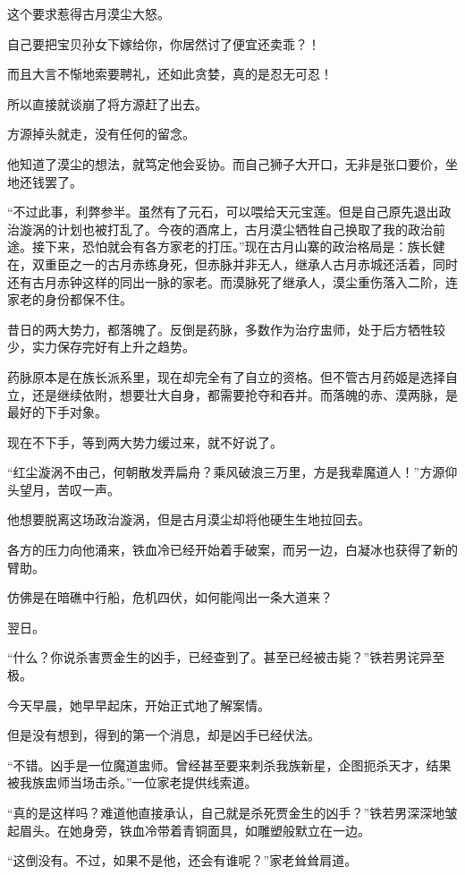 \begin{this_body}
这个要求惹得古月漠尘大怒。

自己要把宝贝孙女下嫁给你，你居然讨了便宜还卖乖？！

而且大言不惭地索要聘礼，还如此贪婪，真的是忍无可忍！

所以直接就谈崩了将方源赶了出去。

方源掉头就走，没有任何的留念。

他知道了漠尘的想法，就笃定他会妥协。而自己狮子大开口，无非是张口要价，坐地还钱罢了。

“不过此事，利弊参半。虽然有了元石，可以喂给天元宝莲。但是自己原先退出政治漩涡的计划也被打乱了。今夜的酒席上，古月漠尘牺牲自己换取了我的政治前途。接下来，恐怕就会有各方家老的打压。”现在古月山寨的政治格局是：族长健在，双重臣之一的古月赤练身死，但赤脉并非无人，继承人古月赤城还活着，同时还有古月赤钟这样的同出一脉的家老。而漠脉死了继承人，漠尘重伤落入二阶，连家老的身份都保不住。

昔日的两大势力，都落魄了。反倒是药脉，多数作为治疗盅师，处于后方牺牲较少，实力保存完好有上升之趋势。

药脉原本是在族长派系里，现在却完全有了自立的资格。但不管古月药姬是选择自立，还是继续依附，想要壮大自身，都需要抢夺和吞并。而落魄的赤、漠两脉，是最好的下手对象。

现在不下手，等到两大势力缓过来，就不好说了。

“红尘漩涡不由己，何朝散发弄扁舟？乘风破浪三万里，方是我辈魔道人！”方源仰头望月，苦叹一声。

他想要脱离这场政治漩涡，但是古月漠尘却将他硬生生地拉回去。

各方的压力向他涌来，铁血冷已经开始着手破案，而另一边，白凝冰也获得了新的臂助。

仿佛是在暗礁中行船，危机四伏，如何能闯出一条大道来？

翌日。

“什么？你说杀害贾金生的凶手，已经查到了。甚至已经被击毙？”铁若男诧异至极。

今天早晨，她早早起床，开始正式地了解案情。

但是没有想到，得到的第一个消息，却是凶手已经伏法。

“不错。凶手是一位魔道盅师。曾经甚至要来刺杀我族新星，企图扼杀天才，结果被我族盅师当场击杀。”一位家老提供线索道。

“真的是这样吗？难道他直接承认，自己就是杀死贾金生的凶手？”铁若男深深地皱起眉头。在她身旁，铁血冷带着青铜面具，如雕塑般默立在一边。

“这倒没有。不过，如果不是他，还会有谁呢？”家老耸耸肩道。


\end{this_body}
